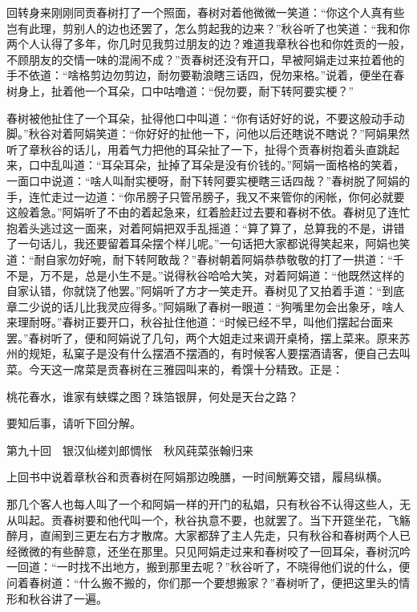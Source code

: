 \documentclass[12pt,UTF8]{ctexbook}
\begin{document}
{{{回转身来刚刚同贡春树打了一个照面，春树对着他微微一笑道：“你这个人真有些岂有此理，剪别人的边也还罢了，怎么剪起我的边来？”秋谷听了也笑道：“我和你两个人认得了多年，你几时见我剪过朋友的边？难道我章秋谷也和你姓贡的一般，不顾朋友的交情一味的混闹不成？”贡春树还没有开口，早被阿娟走过来拉着他的手不依道：“啥格剪边勿剪边，耐勿要勒浪瞎三话四，倪勿来格。”说着，便坐在春树身上，扯着他一个耳朵，口中咕噜道：“倪勿要，耐下转阿要实梗？”

春树被他扯住了一个耳朵，扯得他口中叫道：“你有话好好的说，不要这般动手动脚。”秋谷对着阿娟笑道：“你好好的扯他一下，问他以后还瞎说不瞎说？”阿娟果然听了章秋谷的话儿，用着气力把他的耳朵扯了一下，扯得个贡春树抱着头直跳起来，口中乱叫道：“耳朵耳朵，扯掉了耳朵是没有价钱的。”阿娟一面格格的笑着，一面口中说道：“啥人叫耐实梗呀，耐下转阿要实梗瞎三话四哉？”春树脱了阿娟的手，连忙走过一边道：“你吊膀子只管吊膀子，我又不来管你的闲帐，你何必就要这般着急。”阿娟听了不由的着起急来，红着脸赶过去要和春树不依。春树见了连忙抱着头逃过这一面来，对着阿娟把双手乱摇道：“算了算了，总算我的不是，讲错了一句话儿，我还要留着耳朵摆个样儿呢。”一句话把大家都说得笑起来，阿娟也笑道：“耐自家勿好啘，耐下转阿敢哉？”春树朝着阿娟恭恭敬敬的打了一拱道：“千不是，万不是，总是小生不是。”说得秋谷哈哈大笑，对着阿娟道：“他既然这样的自家认错，你就饶了他罢。”阿娟听了方才一笑走开。春树见了又拍着手道：“到底章二少说的话儿比我灵应得多。”阿娟瞅了春树一眼道：“狗嘴里勿会出象牙，啥人来理耐呀。”春树正要开口，秋谷扯住他道：“时候已经不早，叫他们摆起台面来罢。”春树听了，便和阿娟说了几句，两个大姐走过来调开桌椅，摆上菜来。原来苏州的规矩，私窠子是没有什么摆酒不摆酒的，有时候客人要摆酒请客，便自己去叫菜。今天这一席菜是贡春树在三雅园叫来的，肴馔十分精致。正是：

桃花春水，谁家有蛱蝶之图？珠箔银屏，何处是天台之路？

要知后事，请听下回分解。





第九十回　银汉仙槎刘郎惆怅　秋风莼菜张翰归来





上回书中说着章秋谷和贡春树在阿娟那边晚膳，一时间觥筹交错，履舄纵横。

那几个客人也每人叫了一个和阿娟一样的开门的私娼，只有秋谷不认得这些人，无从叫起。贡春树要和他代叫一个，秋谷执意不要，也就罢了。当下开筵坐花，飞觞醉月，直闹到三更左右方才散席。大家都辞了主人先走，只有秋谷和春树两个人已经微微的有些醉意，还坐在那里。只见阿娟走过来和春树咬了一回耳朵，春树沉吟一回道：“一时找不出地方，搬到那里去呢？”秋谷听了，不晓得他们说的什么，便问着春树道：“什么搬不搬的，你们那一个要想搬家？”春树听了，便把这里头的情形和秋谷讲了一遍。

}}}
\end{document}
